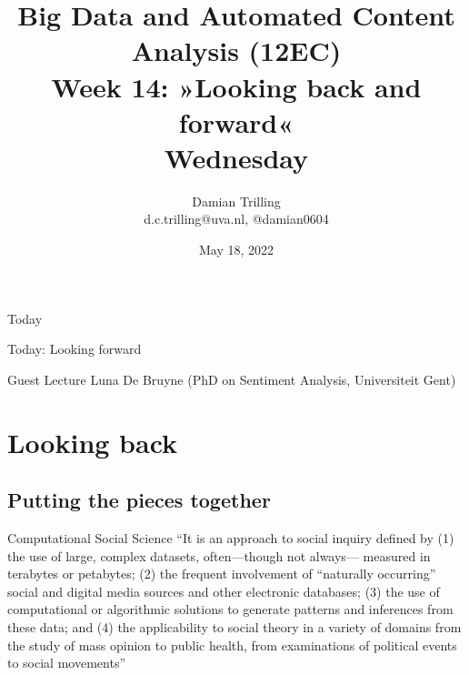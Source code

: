 

\graphicspath{{../../resources/img/}}




\title[Big Data and Automated Content Analysis]{\textbf{Big Data and Automated Content Analysis (12EC)} 
\\Week 14: »Looking back and forward«
\\Wednesday}
\author[Damian Trilling]{Damian Trilling\\ \footnotesize{d.c.trilling@uva.nl, @damian0604 \\}}
\date{May 18, 2022}


\begin{frame}{}
	\titlepage
\end{frame}

\begin{frame}{Today}
	\tableofcontents
\end{frame}


\begin{frame}[standout]
Today: Looking forward
\end{frame}


\begin{frame}[standout]
Guest Lecture Luna De Bruyne
(PhD on Sentiment Analysis, Universiteit Gent)
\end{frame}










\section{Looking back}
\subsection{Putting the pieces together}


\begin{frame}{Computational Social Science \parencite{Shah2015}}
	``It is an approach to social inquiry defined by (1) the use of large, complex datasets, often—though not always— measured in terabytes or petabytes; (2) the frequent involvement of “naturally occurring” social and digital media sources and other electronic databases; (3) the use of computational or algorithmic solutions to generate patterns and inferences from these data; and (4) the applicability to social theory in a variety of domains from the study of mass opinion to public health, from examinations of political events to social movements''
\end{frame}





